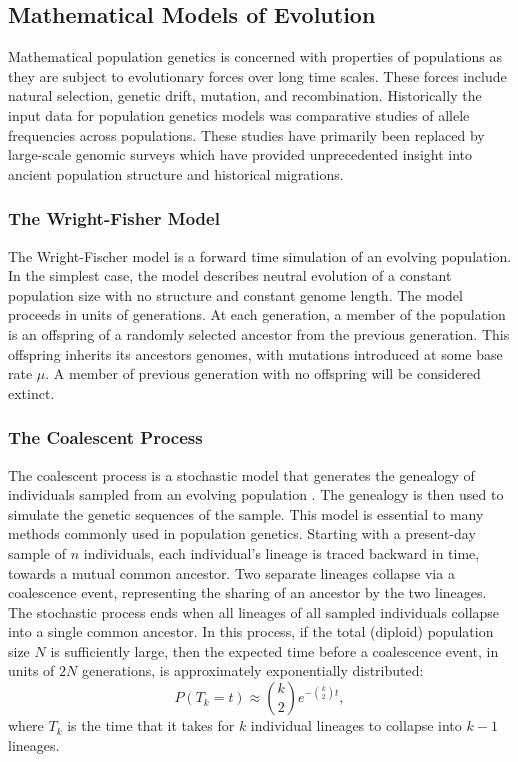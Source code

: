\subsection{Mathematical Models of Evolution}
\label{background:ss:evolutionary_models}

Mathematical population genetics is concerned with properties of populations as they are subject to evolutionary forces over long time scales.
These forces include natural selection, genetic drift, mutation, and recombination.
Historically the input data for population genetics models was comparative studies of allele frequencies across populations.
These studies have primarily been replaced by large-scale genomic surveys which have provided unprecedented insight into ancient population structure and historical migrations.

\subsubsection{The Wright-Fisher Model}

The Wright-Fischer model is a forward time simulation of an evolving population.
In the simplest case, the model describes neutral evolution of a constant population size with no structure and constant genome length.
The model proceeds in units of generations.
At each generation, a member of the population is an offspring of a randomly selected ancestor from the previous generation.
This offspring inherits its ancestors genomes, with mutations introduced at some base rate $\mu$.
A member of previous generation with no offspring will be considered extinct.

\subsubsection{The Coalescent Process}
\label{background:sss:coalescent}

The coalescent process is a stochastic model that generates the genealogy of individuals sampled from an evolving population \cite{Wakeley:2009}.
The genealogy is then used to simulate the genetic sequences of the sample.
This model is essential to many methods commonly used in population genetics.
Starting with a present-day sample of $n$ individuals, each individual's lineage is traced backward in time, towards a mutual common ancestor.
Two separate lineages collapse via a coalescence event, representing the sharing of an ancestor by the two lineages.
The stochastic process ends when all lineages of all sampled individuals collapse into a single common ancestor.
In this process, if the total (diploid) population size $N$ is sufficiently large, then the expected time before a coalescence event, in units of $2N$ generations, is approximately exponentially distributed:
\begin{equation}
P(T_{k}=t) \approx \binom{k}{2} e ^{-\binom{k}{2} t},
\end{equation}
where $T_k$ is the time that it takes for $k$ individual lineages to collapse into $k-1$ lineages.

